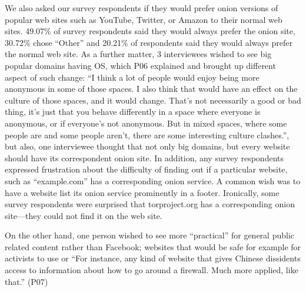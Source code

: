 We also asked our survey respondents if they would prefer onion versions of popular web sites such as
YouTube, Twitter, or Amazon to their normal web
sites. 49.07\% of survey respondents said they
would always prefer the onion site, 30.72\% chose ``Other'' and 20.21\% of
respondents said they would always prefer the normal web site. As a further matter, 3 interviewees wished to see big popular domains having OS, which P06 explained and brought up different aspect of such change: ``I think a lot of people would enjoy being more anonymous in some of those spaces. I also think that would have an effect on the culture of those spaces, and it would change. That's not necessarily a good or bad thing, it's just that you behave differently in a space where everyone is anonymous, or if everyone's not anonymous. But in mixed spaces, where some people are and some people aren't, there are some interesting culture clashes.'', but also, one interviewee thought that not only big domains, but every website should have its correspondent onion site. In addition, any survey respondents expressed frustration about the difficulty of finding out if a particular website, such as 
``example.com'' has a corresponding onion service.  A common wish was to have
a website list its onion service prominently in a footer.  Ironically, some
survey respondents were surprised that torproject.org has a corresponding onion
site---they could not find it on the web site.


 On the other hand, one person wished to see more ``practical'' for general public related content rather than Facebook; websites that would be safe for example for activists to use or ``For instance, any kind of website that gives Chinese dissidents access to information about how to go around a firewall. Much more applied, like that.'' (P07)

